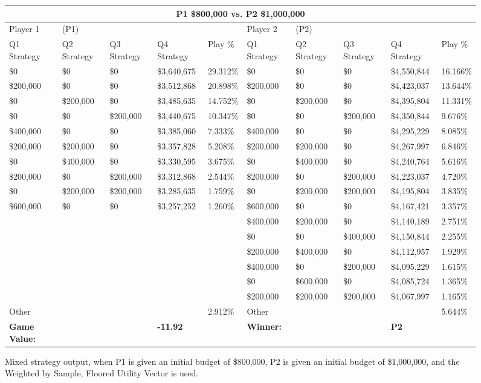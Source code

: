 \documentclass[11pt]{article}
\begin{document}
\begin{figure}
\tiny
\begin{tabular}{ |p{1.0cm}p{1.0cm}p{1.0cm}p{2.0cm}|p{1.0cm}||p{1.0cm}p{1.0cm}p{1.0cm}p{2.0cm}|p{1.0cm}|}
\hline
\multicolumn{10}{|c|}{P1 \$800,000 vs. P2 \$1,000,000} \\
\hline
Player 1 & (P1) & & & & Player 2 & (P2) & & & \\
\hline
Q1 Strategy & Q2 Strategy & Q3 Strategy & Q4 Strategy  &  Play \% & Q1 Strategy & Q2 Strategy & Q3 Strategy & Q4 Strategy  &  Play \%\\
\hline
\$0 & \$0 & \$0 & \$3,640,675 & 29.312\% & \$0 & \$0 & \$0 & \$4,550,844 & 16.166\% \\
\$200,000 & \$0 & \$0 & \$3,512,868 & 20.898\% & \$200,000 & \$0 & \$0 & \$4,423,037 & 13.644\% \\
\$0 & \$200,000 & \$0 & \$3,485,635 & 14.752\% & \$0 & \$200,000 & \$0 & \$4,395,804 & 11.331\% \\
\$0 & \$0 & \$200,000 & \$3,440,675 & 10.347\% & \$0 & \$0 & \$200,000 & \$4,350,844 & 9.676\% \\
\$400,000 & \$0 & \$0 & \$3,385,060 & 7.333\% & \$400,000 & \$0 & \$0 & \$4,295,229 & 8.085\% \\
\$200,000 & \$200,000 & \$0 & \$3,357,828 & 5.208\% & \$200,000 & \$200,000 & \$0 & \$4,267,997 & 6.846\% \\
\$0 & \$400,000 & \$0 & \$3,330,595 & 3.675\% & \$0 & \$400,000 & \$0 & \$4,240,764 & 5.616\% \\
\$200,000 & \$0 & \$200,000 & \$3,312,868 & 2.544\% & \$200,000 & \$0 & \$200,000 & \$4,223,037 & 4.720\% \\
\$0 & \$200,000 & \$200,000 & \$3,285,635 & 1.759\% & \$0 & \$200,000 & \$200,000 & \$4,195,804 & 3.835\% \\
\$600,000 & \$0 & \$0 & \$3,257,252 & 1.260\% & \$600,000 & \$0 & \$0 & \$4,167,421 & 3.357\% \\
&&&&&\$400,000 & \$200,000 & \$0 & \$4,140,189 & 2.751\% \\
&&&&&\$0 & \$0 & \$400,000 & \$4,150,844 & 2.255\% \\
&&&&&\$200,000 & \$400,000 & \$0 & \$4,112,957 & 1.929\% \\
&&&&&\$400,000 & \$0 & \$200,000 & \$4,095,229 & 1.615\% \\
&&&&&\$0 & \$600,000 & \$0 & \$4,085,724 & 1.365\% \\
&&&&&\$200,000 & \$200,000 & \$200,000 & \$4,067,997 & 1.165\% \\
\hline
Other &&&& 2.912\% & Other &&&& 5.644\% \\
\hline
\small \textbf{Game Value:} &&& \small \textbf{-11.92} && \small \textbf{Winner:} &&& \small \textbf{P2}&\\
\hline
\end{tabular}
\caption{Mixed strategy output, when P1 is given an initial budget of \$800,000, P2 is given an initial budget of \$1,000,000, and the Weighted by Sample, Floored Utility Vector is used.}
\label{8v10table.3}
\end{figure}
\end{document}
